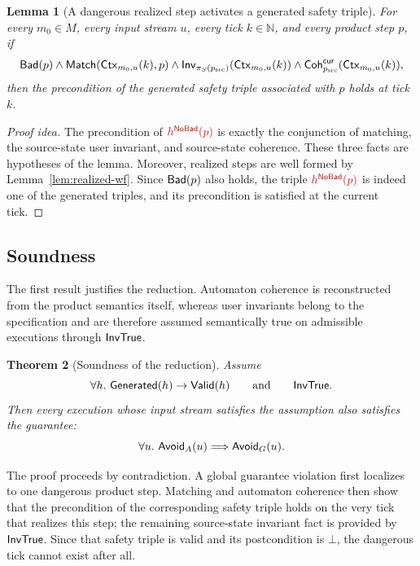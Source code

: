 \documentclass[acmsmall,screen]{acmart}
\theoremstyle{leftplain}
\newtheorem{theorem}{Theorem}
\newtheorem{lemma}[theorem]{Lemma}
\theoremstyle{leftdefinition}
\theoremstyle{leftremark}
\begin{document}
\begin{lemma}[A dangerous realized step activates a generated safety triple]
\label{lem:activate-nobad}
For every $m_0 \in M$, every input stream $u$, every tick $k \in \mathbb{N}$,
and every product step $p$, if
\[
  \mathsf{Bad}(p)
  \wedge
  \mathsf{Match}(\mathsf{Ctx}_{m_0,u}(k),p)
  \wedge
  \mathsf{Inv}_{\pi_S(p_{\mathrm{src}})}(\mathsf{Ctx}_{m_0,u}(k))
  \wedge
  \mathsf{Coh}^{\mathsf{cur}}_{p_{\mathrm{src}}}(\mathsf{Ctx}_{m_0,u}(k)),
\]
then the precondition of the generated safety triple associated with $p$ holds
at tick $k$.
\end{lemma}

\begin{proof}[Proof idea]
The precondition of $\triplesafe{h^{\NoBad}(p)}$ is exactly the conjunction of
matching, the source-state user invariant, and source-state coherence. These
three facts are hypotheses of the lemma. Moreover, realized steps are
well formed by Lemma~\ref{lem:realized-wf}. Since $\mathsf{Bad}(p)$ also holds, the
triple $\triplesafe{h^{\NoBad}(p)}$ is indeed one of the generated triples, and
its precondition is satisfied at the current tick.
\end{proof}

\subsection{Soundness}
The first result justifies the reduction. Automaton coherence is reconstructed
from the product semantics itself, whereas user invariants belong to the
specification and are therefore assumed semantically true on admissible
executions through $\mathsf{InvTrue}$.

\begin{theorem}[Soundness of the reduction]
\label{thm:soundness}
Assume
\[
  \forall h.\ \mathsf{Generated}(h) \rightarrow \mathsf{Valid}(h)
  \qquad\text{and}\qquad
  \mathsf{InvTrue}.
\]
Then every execution whose input stream satisfies the assumption also satisfies
the guarantee:
\[
  \forall u.\ \mathsf{Avoid}_A(u) \Longrightarrow \mathsf{Avoid}_G(u).
\]
\end{theorem}

\noindent{}
The proof proceeds by contradiction. A global guarantee violation first
localizes to one dangerous product step. Matching and automaton coherence then
show that the precondition of the corresponding safety triple holds on the very
tick that realizes this step; the remaining source-state invariant fact is
provided by $\mathsf{InvTrue}$. Since that safety triple is valid and its
postcondition is $\bot$, the dangerous tick cannot exist after all.
\end{document}
